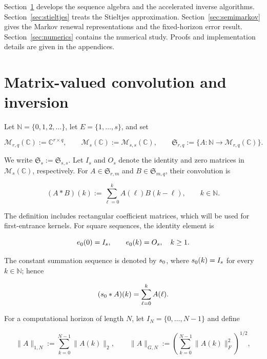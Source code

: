 \documentclass[3p,12pt,authoryear]{elsarticle}
\theoremstyle{definition}
\theoremstyle{remark}
\newcommand{\N}{\mathbb N}
\newcommand{\C}{\mathbb C}
\newcommand{\ez}{e_{\mathstrut 0}}
\newcommand{\sd}{s_{\mathstrut 0}}
\begin{document}
Section~\ref{sec:convolution} develops the sequence algebra and the accelerated inverse algorithms. Section~\ref{sec:stieltjes} treats the Stieltjes approximation. Section~\ref{sec:semimarkov} gives the Markov renewal representations and the fixed-horizon error result. Section~\ref{sec:numerics} contains the numerical study. Proofs and implementation details are given in the appendices.

\section{Matrix-valued convolution and inversion}\label{sec:convolution}

Let $\N=\{0,1,2,\ldots\}$, let $E=\{1,\ldots,s\}$, and set

\begin{equation*}
\mathcal M_{r,q}(\C):=\C^{r\times q},
\qquad
\mathcal M_s(\C):=\mathcal M_{s,s}(\C),
\qquad
\mathfrak S_{r,q}:=\{A:\N\longrightarrow\mathcal M_{r,q}(\C)\}.
\end{equation*}

We write $\mathfrak S_s:=\mathfrak S_{s,s}$. Let $I_s$ and $O_s$ denote the identity and zero matrices in $\mathcal M_s(\C)$, respectively. For $A\in\mathfrak S_{r,m}$ and $B\in\mathfrak S_{m,q}$, their convolution is

\begin{equation}\label{eq:convolution}
(A*B)(k):=\sum_{\ell=0}^{k}A(\ell)B(k-\ell),
\qquad k\in\N.
\end{equation}

The definition includes rectangular coefficient matrices, which will be used for first-entrance kernels. For square sequences, the identity element is

\begin{equation*}
\ez(0)=I_s,
\qquad
\ez(k)=O_s,
\quad k\geq1.
\end{equation*}

The constant summation sequence is denoted by $\sd$, where $\sd(k)=I_s$ for every $k\in\N$; hence

\begin{equation*}
(\sd*A)(k)=\sum_{\ell=0}^{k}A(\ell).
\end{equation*}


For a computational horizon of length $N$, let $I_N=\{0,\ldots,N-1\}$ and define

\begin{equation*}
\|A\|_{1,N}:=\sum_{k=0}^{N-1}\|A(k)\|_2,
\qquad
\|A\|_{G,N}:=
\left(\sum_{k=0}^{N-1}\|A(k)\|_F^2\right)^{1/2},
\end{equation*}
\end{document}
